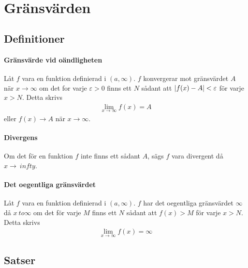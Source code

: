 \section{Gränsvärden}

\subsection{Definitioner}

\paragraph{Gränsvärde vid oändligheten}
Låt $f$ vara en funktion definierad i $(a, \infty)$. $f$ konvergerar mot gränsvärdet $A$ när $x\to\infty$ om det for varje $\varepsilon > 0$ finns ett $N$ sådant att $\abs{f(x) - A} < \varepsilon$ för varje $x > N$. Detta skrivs
\begin{align*}
	\lim_{x \to \infty} f(x) = A
\end{align*}
eller $f(x) \to A$ när $x \to \infty$.

\paragraph{Divergens}
Om det för en funktion $f$ inte finns ett sådant $A$, sägs $f$ vara divergent då $x \to \ infty$.

\paragraph{Det oegentliga gränsvärdet}
Låt $f$ vara en funktion definierad i $(a, \infty)$. $f$ har det oegentliga gränsvärdet $\infty$ då $x \ to \infty$ om det för varje $M$ finns ett $N$ sådant att $f(x) > M$ för varje $x > N$. Detta skrivs
\begin{align*}
	\lim_{x \to \infty} f(x) = \infty
\end{align*}

\subsection{Satser}